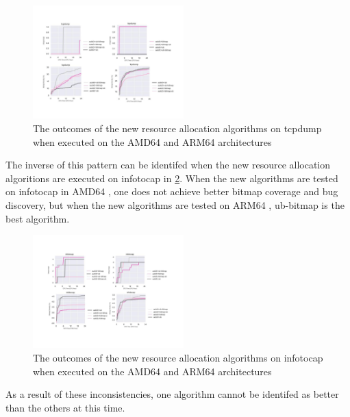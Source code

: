 \begin{figure}
    \includegraphics[width=0.52\textwidth]{figs/tcpdump_algo_compare.png}
    \centering
    \caption{The outcomes of the new resource allocation algorithms on tcpdump when executed on the AMD64 and ARM64 architectures}
    \label{figs:tcpdump_algo_compare.png}
\end{figure}

The inverse of this pattern can be identifed when the new resource allocation algoritions are executed on infotocap in 
\ref{figs:infotocap_algo_compare.png}. When the new algorithms are tested on infotocap in AMD64 , one does not achieve better
bitmap coverage and bug discovery, but when the new algorithms are tested on ARM64 , ub-bitmap is the best algorithm.

\begin{figure}

    \includegraphics[width=0.52\textwidth]{figs/infotocap_algo_compare.png}
    \centering
    \caption{The outcomes of the new resource allocation algorithms on infotocap when executed on the AMD64 and ARM64 architectures}
    \label{figs:infotocap_algo_compare.png}
\end{figure}

As a result of these inconsistencies, one algorithm cannot be identifed as better than the others at this time.


